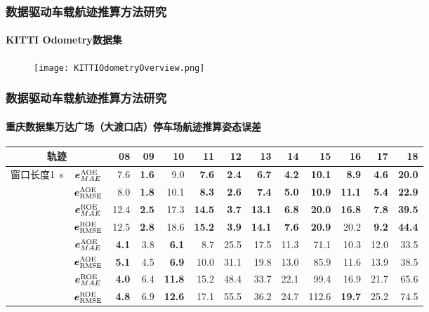 \begin{frame} 
 	\frametitle{数据驱动车载航迹推算方法研究}
 	\framesubtitle{KITTI Odometry数据集}
   	\begin{figure}
   	\centering
	    \texttt{[image: KITTIOdometryOverview.png]}
   	\end{figure}  
\end{frame}

\begin{frame} 
 	\frametitle{数据驱动车载航迹推算方法研究}
 	\framesubtitle{重庆数据集万达广场（大渡口店）停车场航迹推算姿态误差}
    {\small
    \setlength{\tabcolsep}{2pt}
		\begin{tabular*}{\linewidth}{@{\extracolsep{\fill}}ccrrrrrrrrrrr}
			\toprule
			\multicolumn{2}{c}{轨迹} & 08 & 09 & 10 & 11 & 12 & 13 & 14 & 15 & 16 & 17 & 18 \\
			\midrule
			\multirow{4}{*}{窗口长度\SI{1}{\second}} 
			& $\vb*{e}^{\mathrm{AOE}}_{MAE}$ & 7.6 & \textbf{1.6} & 9.0 & \textbf{7.6} & \textbf{2.4} & \textbf{6.7} & \textbf{4.2} & \textbf{10.1} & \textbf{8.9} & \textbf{4.6} & \textbf{20.0} \\
			& $\vb*{e}^{\mathrm{AOE}}_{\mathrm{RMSE}}$ & 8.0 & \textbf{1.8} & 10.1 & \textbf{8.3} & \textbf{2.6} & \textbf{7.4} & \textbf{5.0} & \textbf{10.9} & \textbf{11.1} & \textbf{5.4} & \textbf{22.9} \\
			& $\vb*{e}^{\mathrm{ROE}}_{MAE}$ & 12.4 & \textbf{2.5} & 17.3 & \textbf{14.5} & \textbf{3.7} & \textbf{13.1} & \textbf{6.8} & \textbf{20.0} & \textbf{16.8} & \textbf{7.8} & \textbf{39.5} \\
			& $\vb*{e}^{\mathrm{ROE}}_{\mathrm{RMSE}}$ & 12.5 & \textbf{2.8} & 18.6 & \textbf{15.2} & \textbf{3.9} & \textbf{14.1} & \textbf{7.6} & \textbf{20.9} & 20.2 & \textbf{9.2} & \textbf{44.4} \\ \addlinespace[1mm]
			\multirow{4}{*}{窗口长度\SI{2}{\second}}
			& $\vb*{e}^{\mathrm{AOE}}_{MAE}$ & \textbf{4.1} & 3.8 & \textbf{6.1} & 8.7 & 25.5 & 17.5 & 11.3 & 71.1 & 10.3 & 12.0 & 33.5 \\
			& $\vb*{e}^{\mathrm{AOE}}_{\mathrm{RMSE}}$ & \textbf{5.1} & 4.5 & \textbf{6.9} & 10.0 & 31.1 & 19.8 & 13.0 & 85.9 & 11.6 & 13.9 & 38.5 \\
			& $\vb*{e}^{\mathrm{ROE}}_{MAE}$ & \textbf{4.0} & 6.4 & \textbf{11.8} & 15.2 & 48.4 & 33.7 & 22.1 & 99.4 & 16.9 & 21.7 & 65.6 \\
			& $\vb*{e}^{\mathrm{ROE}}_{\mathrm{RMSE}}$ & \textbf{4.8} & 6.9 & \textbf{12.6} & 17.1 & 55.5 & 36.2 & 24.7 & 112.6 & \textbf{19.7} & 25.2 & 74.5 \\
			\bottomrule 
		\end{tabular*}
	}	
\end{frame}


